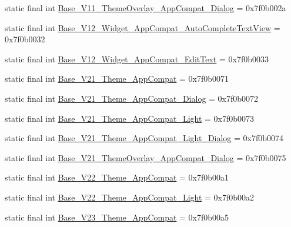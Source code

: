 \begin{CompactItemize}
\item 
static final int \hyperlink{classandroid_1_1support_1_1graphics_1_1drawable_1_1animated_1_1_r_1_1style_95bb1a79b63aec69356dce26522391dd}{Base\_\-V11\_\-ThemeOverlay\_\-AppCompat\_\-Dialog} = 0x7f0b002a
\item 
static final int \hyperlink{classandroid_1_1support_1_1graphics_1_1drawable_1_1animated_1_1_r_1_1style_147b692d537739d005468dad8217fd54}{Base\_\-V12\_\-Widget\_\-AppCompat\_\-AutoCompleteTextView} = 0x7f0b0032
\item 
static final int \hyperlink{classandroid_1_1support_1_1graphics_1_1drawable_1_1animated_1_1_r_1_1style_9b8136459f44077567962feec3e04fdb}{Base\_\-V12\_\-Widget\_\-AppCompat\_\-EditText} = 0x7f0b0033
\item 
static final int \hyperlink{classandroid_1_1support_1_1graphics_1_1drawable_1_1animated_1_1_r_1_1style_1d2ec63f00af991d1babd7e173c80a20}{Base\_\-V21\_\-Theme\_\-AppCompat} = 0x7f0b0071
\item 
static final int \hyperlink{classandroid_1_1support_1_1graphics_1_1drawable_1_1animated_1_1_r_1_1style_6a5fa82fa2107ad7c825e4c19c328d52}{Base\_\-V21\_\-Theme\_\-AppCompat\_\-Dialog} = 0x7f0b0072
\item 
static final int \hyperlink{classandroid_1_1support_1_1graphics_1_1drawable_1_1animated_1_1_r_1_1style_64c41aac82bfda48f60f3cad8328a11a}{Base\_\-V21\_\-Theme\_\-AppCompat\_\-Light} = 0x7f0b0073
\item 
static final int \hyperlink{classandroid_1_1support_1_1graphics_1_1drawable_1_1animated_1_1_r_1_1style_cf45be783797bcd209ed035d794bce04}{Base\_\-V21\_\-Theme\_\-AppCompat\_\-Light\_\-Dialog} = 0x7f0b0074
\item 
static final int \hyperlink{classandroid_1_1support_1_1graphics_1_1drawable_1_1animated_1_1_r_1_1style_d2a18f0e25282debde6bf0d571af0cdb}{Base\_\-V21\_\-ThemeOverlay\_\-AppCompat\_\-Dialog} = 0x7f0b0075
\item 
static final int \hyperlink{classandroid_1_1support_1_1graphics_1_1drawable_1_1animated_1_1_r_1_1style_da24148aff5510e5216b2d6f38646f78}{Base\_\-V22\_\-Theme\_\-AppCompat} = 0x7f0b00a1
\item 
static final int \hyperlink{classandroid_1_1support_1_1graphics_1_1drawable_1_1animated_1_1_r_1_1style_9862b2189d9712e305eb7957e4ebcec8}{Base\_\-V22\_\-Theme\_\-AppCompat\_\-Light} = 0x7f0b00a2
\item 
static final int \hyperlink{classandroid_1_1support_1_1graphics_1_1drawable_1_1animated_1_1_r_1_1style_92ea6a6d59f91f2488dbdf3ddea604e0}{Base\_\-V23\_\-Theme\_\-AppCompat} = 0x7f0b00a5

\end{CompactItemize}
